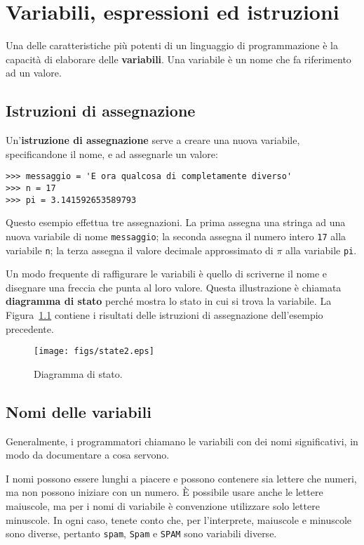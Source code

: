 \documentclass[10pt]{book}
\begin{document}
\chapter{Variabili, espressioni ed istruzioni}

Una delle caratteristiche più potenti di un linguaggio di programmazione è la capacità di elaborare delle {\bf variabili}. Una variabile è un nome che fa riferimento ad un valore.

\section{Istruzioni di assegnazione}
\label{variables}

Un'{\bf istruzione di assegnazione} serve a creare una nuova variabile, specificandone il nome, e ad assegnarle un valore:

\begin{verbatim}
>>> messaggio = 'E ora qualcosa di completamente diverso'
>>> n = 17
>>> pi = 3.141592653589793
\end{verbatim}
%
Questo esempio effettua tre assegnazioni. La prima assegna una stringa
ad una nuova variabile di nome {\tt messaggio}; la seconda assegna il numero intero {\tt 17} alla variabile {\tt n}; la terza assegna il valore decimale approssimato di $\pi$ alla variabile {\tt pi}.

Un modo frequente di raffigurare le variabili è quello di scriverne il nome e disegnare una freccia che punta al loro valore. Questa illustrazione è chiamata {\bf diagramma di stato} perché mostra lo stato in cui si trova la variabile. La Figura~\ref{fig.state2} contiene i risultati delle istruzioni di assegnazione dell'esempio precedente.

\begin{figure}
\centerline
{\texttt{[image: figs/state2.eps]}}
\caption{Diagramma di stato.}
\label{fig.state2}
\end{figure}

\section{Nomi delle variabili}

Generalmente, i programmatori chiamano le variabili con dei nomi significativi, in modo da documentare a cosa servono.

I nomi possono essere lunghi a piacere e possono contenere sia lettere che numeri, ma non possono iniziare con un numero. È possibile usare anche le lettere maiuscole, ma per i nomi di variabile è convenzione utilizzare solo lettere minuscole. In ogni caso, tenete conto che, per l'interprete, maiuscole e minuscole sono diverse, pertanto \verb"spam", \verb"Spam" e \verb"SPAM" sono variabili diverse.
\end{document}
